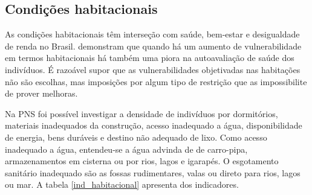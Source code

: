 \documentclass[
	12pt,				%
	openright,			%
	twoside,			%
	a4paper,			%
	english,			%
	french,				%
	spanish,			%
	brazil				%
	]{abntex2}
\begin{document}
\begin{table}[H]
	\footnotesize
	\centering
	\caption{Indicadores de desenvolvimento infantil}
	\label{ind_des_infantil}
\end{table}

\subsection{Condições habitacionais}
  As condições habitacionais têm interseção com saúde, bem-estar e desigualdade de renda no Brasil.   demonstram que quando há um aumento de vulnerabilidade em termos habitacionais há também uma piora na autoavaliação de saúde dos indivíduos. É razoável supor que as vulnerabilidades objetivadas nas habitações não são escolhas, mas imposições por algum tipo de restrição que as impossibilite de prover melhoras. 
  
  Na PNS foi possível investigar a densidade de indivíduos por dormitórios, materiais inadequados da construção, acesso inadequado a água, disponibilidade de energia, bens duráveis e destino não adequado de lixo. Como acesso inadequado a água, entendeu-se a água advinda de de carro-pipa, armazenamentos em cisterna ou por rios, lagos e igarapés. O esgotamento sanitário inadequado são as fossas rudimentares, valas ou direto para rios, lagos ou mar. A tabela \ref{ind_habitacional} apresenta dos indicadores.
  
\end{document}
